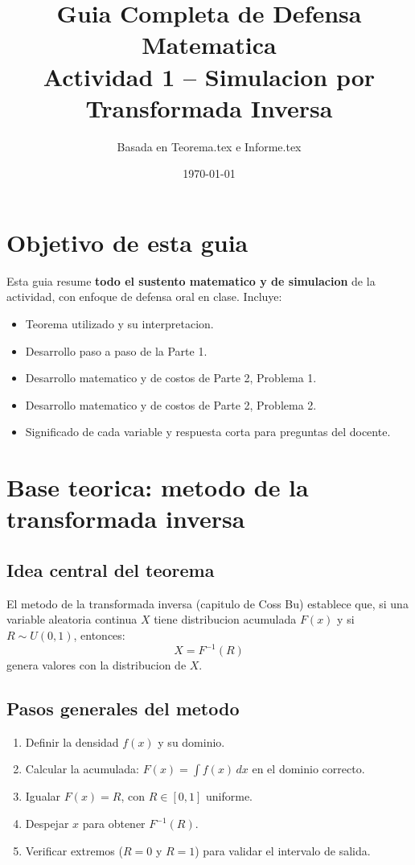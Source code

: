 \documentclass[12pt,a4paper]{article}
\title{Guia Completa de Defensa Matematica\\
Actividad 1 -- Simulacion por Transformada Inversa}
\author{Basada en Teorema.tex e Informe.tex}
\date{\today}
\begin{document}
\maketitle
\tableofcontents
\newpage

\section{Objetivo de esta guia}
Esta guia resume \textbf{todo el sustento matematico y de simulacion} de la actividad, con enfoque de defensa oral en clase. Incluye:
\begin{itemize}
  \item Teorema utilizado y su interpretacion.
  \item Desarrollo paso a paso de la Parte 1.
  \item Desarrollo matematico y de costos de Parte 2, Problema 1.
  \item Desarrollo matematico y de costos de Parte 2, Problema 2.
  \item Significado de cada variable y respuesta corta para preguntas del docente.
\end{itemize}

\section{Base teorica: metodo de la transformada inversa}

\subsection{Idea central del teorema}
El metodo de la transformada inversa (capitulo de Coss Bu) establece que, si una variable aleatoria continua $X$ tiene distribucion acumulada $F(x)$ y si $R\sim U(0,1)$, entonces:
\[
X = F^{-1}(R)
\]
genera valores con la distribucion de $X$.

\subsection{Pasos generales del metodo}
\begin{enumerate}
  \item Definir la densidad $f(x)$ y su dominio.
  \item Calcular la acumulada: $F(x)=\int f(x)\,dx$ en el dominio correcto.
  \item Igualar $F(x)=R$, con $R\in[0,1]$ uniforme.
  \item Despejar $x$ para obtener $F^{-1}(R)$.
  \item Verificar extremos ($R=0$ y $R=1$) para validar el intervalo de salida.
\end{enumerate}
\end{document}
